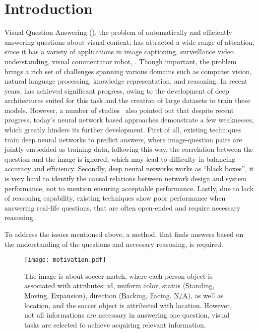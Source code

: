 \section{Introduction}
\label{sec-intro}


Visual Question Answering (\vqa), the
problem of automatically and efficiently answering questions about visual content, has attracted a wide range of attention, since it has a variety of applications in \eg image captioning, surveillance video understanding, visual commentator robot, \etc. 
Though important, the \vqa problem brings a rich set of challenges spanning various domains such as computer vision, natural language processing, knowledge representation, and reasoning. 
In recent years, \vqa has achieved significant
progress, owing to the development of deep architectures suited for this task and the creation of large \vqa datasets to train these models. 
However, a number of studies~\cite{peixi2019,Goyal_2017} also pointed out that despite recent progress, today's neural network based approaches demonstrate a few weaknesses, which greatly hinders its further development. First of all, existing techniques train deep neural networks to predict answers, where image-question pairs are jointly embedded as training data, following this way, the correlation between the question and the image is ignored, which may lead to difficulty in balancing accuracy and efficiency. Secondly, deep neural networks works as ``black boxes'', it is very hard to identify the causal relations between network design and system performance, not to mention ensuring acceptable performance. Lastly, due to lack of reasoning capability, existing techniques show poor performance when answering real-life questions, that are often open-ended and require necessary reasoning. 

To address the issues mentioned above, a method, that finds answers based on the understanding of the questions and necessary reasoning, is required. 


\begin{figure}[tb]
\centering
\texttt{[image: motivation.pdf]}
\caption{The image is about soccer match, where each person object is associated with attributes: id, uniform color, status (\underline{S}tanding, \underline{M}oving, \underline{E}xpansion), direction (\underline{B}acking, \underline{F}acing, \underline{N/A}), as well as location, and the soccer object is attributed with location. However, not all informations are necessary in answering one question, visual tasks are selected to achieve acquiring relevant information.%
}
\vspace{-4ex}
\label{fig:example}
\end{figure}


